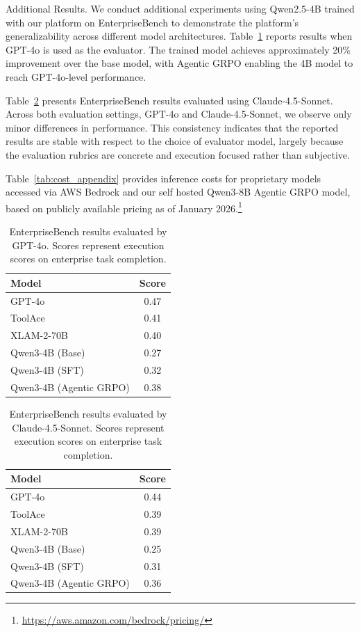 \documentclass{article}
\theoremstyle{plain}
\theoremstyle{definition}
\theoremstyle{remark}
\begin{document}
Additional Results. We conduct additional experiments using Qwen2.5-4B trained with our platform on EnterpriseBench to demonstrate the platform's generalizability across different model architectures. Table~\ref{tab:enterprisebench_gpt4o} reports results when GPT-4o is used as the evaluator. The trained model achieves approximately 20\% improvement over the base model, with Agentic GRPO enabling the 4B model to reach GPT-4o-level performance.

Table~\ref{tab:enterprisebench_claude} presents EnterpriseBench results evaluated using Claude-4.5-Sonnet.
Across both evaluation settings, GPT-4o and Claude-4.5-Sonnet, we observe only minor differences in performance. This consistency indicates that the reported results are stable with respect to the choice of evaluator model, largely because the evaluation rubrics are concrete and execution focused rather than subjective.


Table~\ref{tab:cost_appendix} provides inference costs for proprietary models accessed via AWS Bedrock and our self hosted Qwen3-8B Agentic GRPO model, based on publicly available pricing as of January 2026.\footnote{\url{https://aws.amazon.com/bedrock/pricing/}}



\begin{table}[H]
\centering
\caption{EnterpriseBench results evaluated by GPT-4o. Scores represent execution scores on enterprise task completion.}
\label{tab:enterprisebench_gpt4o}
\begin{tabular}{lc}
\toprule
\textbf{Model} & \textbf{Score} \\
\midrule
GPT-4o & 0.47 \\
ToolAce & 0.41 \\
XLAM-2-70B & 0.40 \\
\midrule
Qwen3-4B (Base) & 0.27 \\
Qwen3-4B (SFT) & 0.32 \\
Qwen3-4B (Agentic GRPO) & 0.38 \\
\bottomrule
\end{tabular}
\end{table}


\begin{table}[H]
\centering
\caption{EnterpriseBench results evaluated by Claude-4.5-Sonnet. Scores represent execution scores on enterprise task completion.}
\label{tab:enterprisebench_claude}
\begin{tabular}{lc}
\toprule
\textbf{Model} & \textbf{Score} \\
\midrule
GPT-4o & 0.44 \\
ToolAce & 0.39 \\
XLAM-2-70B & 0.39 \\
\midrule
Qwen3-4B (Base) & 0.25 \\
Qwen3-4B (SFT) & 0.31 \\
Qwen3-4B (Agentic GRPO) & 0.36 \\
\bottomrule
\end{tabular}
\end{table}
\end{document}
